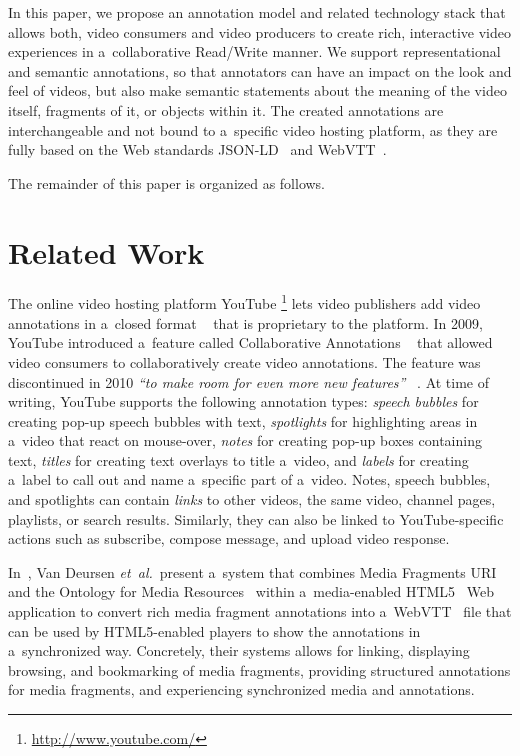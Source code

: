 \documentclass{sig-alternate}
\newcommand{\inlinelistingsize}{\fontsize{8pt}{11pt}}
\let\oldurl\url
\renewcommand{\url}[1]{\inlinelistingsize\oldurl{#1}}
\newcommand{\todo}[1]{\fcolorbox{blue}{white}{\parbox{7cm}{\color{blue}{#1}}}}
\begin{document}
In this paper, we propose an annotation model
and related technology stack that allows both,
video consumers and video producers to create 
rich, interactive video experiences
in a~collaborative Read/Write manner.
We support representational and semantic annotations,
so that annotators can have an impact
on the look and feel of videos,
but also make semantic statements
about the meaning of the video itself, fragments of it,
or objects within it.
The created annotations are interchangeable
and not bound to a~specific video hosting platform,
as they are fully based on the Web standards
JSON-LD~\cite{sporny2013jsonld}
and WebVTT~\cite{pfeiffer2013webvtt}.

The remainder of this paper is organized as follows.
\todo{Describe paper structure}

\section{Related Work}

The online video hosting platform YouTube%
\footnote{\url{http://www.youtube.com/}}
lets video publishers add video annotations
in a~closed format%
~\cite{youtube2008annotations,youtube2010annotations}
that is proprietary to the platform.
In 2009, YouTube introduced a~feature called 
Collaborative Annotations%
~\cite{fink2009collaborativeannotations}
that allowed video consumers to collaboratively
create video annotations.
The feature was discontinued in 2010
\textit{``to make room for even more new features''}%
~\cite{youtube2010annotations}.
At time of writing, YouTube supports the following
annotation types: \emph{speech bubbles} for creating
pop-up speech bubbles with text,
\emph{spotlights} for highlighting areas in a~video
that react on mouse-over,
\emph{notes} for creating pop-up boxes containing text,
\emph{titles} for creating text overlays to title a~video,
and \emph{labels} for creating a~label to call out
and name a~specific part of a~video.
Notes, speech bubbles, and spotlights can contain \emph{links}
to other videos, the same video, channel pages, playlists,
or search results.
Similarly, they can also be linked to YouTube-specific actions
such as subscribe, compose message, and upload video response.
 
In~\cite{vandeursen2012mediafragmentannotations},
Van Deursen \emph{et~al.}\ present a~system
that combines Media Fragments URI~\cite{troncy2012mediafragments} and the Ontology for Media Resources~\cite{lee2012mediaontology}
within a~media-enabled HTML5~\cite{berjon2013html5}
Web application to convert rich media fragment annotations
into a~WebVTT~\cite{pfeiffer2013webvtt} file
that can be used by HTML5-enabled players
to show the annotations in a~synchronized way.
Concretely, their systems allows for linking, displaying
browsing, and bookmarking of media fragments,
providing structured annotations for media fragments,
and experiencing synchronized media and annotations.
\end{document}
